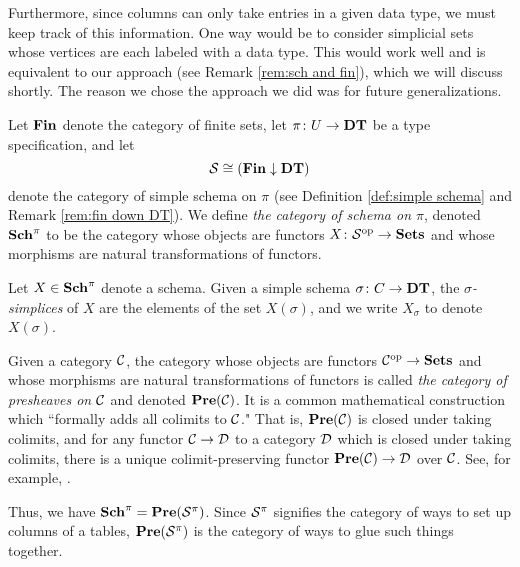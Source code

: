 \documentclass{amsart}
\begin{document}
Furthermore, since columns can only take entries in a given data type, we must keep track of this information.  One way would be to consider simplicial sets whose vertices are each labeled with a data type.  This would work well and is equivalent to our approach (see Remark \ref{rem:sch and fin}), which we will discuss shortly.  The reason we chose the approach we did was for future generalizations.

\begin{definition}\label{def:schema}

Let ${\bf Fin}$ denote the category of finite sets, let $\pi\colon U\rightarrow{\bf DT}$ be a type specification, and let $$\mathcal{S}\cong({\bf Fin}\downarrow{\bf DT})$$ denote the category of simple schema on $\pi$ (see Definition \ref{def:simple schema} and Remark \ref{rem:fin down DT}).  We define {\em the category of schema on $\pi$}, denoted ${\bf Sch}^\pi$ to be the category whose objects are functors $X\colon\mathcal{S}^\textnormal{op}\rightarrow{\bf Sets}$ and whose morphisms are natural transformations of functors.

Let $X\in{\bf Sch}^\pi$ denote a schema.  Given a simple schema $\sigma\colon C\rightarrow{\bf DT}$, the {\em $\sigma$-simplices} of $X$ are the elements of the set $X(\sigma)$, and we write $X_\sigma$ to denote $X(\sigma)$.

\end{definition}

\begin{remark}\label{rem:sch and fin}

Given a category $\mathcal{C}$, the category whose objects are functors $\mathcal{C}^\textnormal{op}\rightarrow{\bf Sets}$ and whose morphisms are natural transformations of functors is called {\em the category of presheaves on $\mathcal{C}$} and denoted ${\bf Pre}(\mathcal{C})$.  It is a common mathematical construction which ``formally adds all colimits to $\mathcal{C}$."  That is, ${\bf Pre}(\mathcal{C})$ is closed under taking colimits, and for any functor $\mathcal{C}\rightarrow\mathcal{D}$ to a category $\mathcal{D}$ which is closed under taking colimits, there is a unique colimit-preserving functor ${\bf Pre}(\mathcal{C})\rightarrow\mathcal{D}$ over $\mathcal{C}$.  See, for example, \cite[I.5.4]{MM}.

Thus, we have ${\bf Sch}^\pi={\bf Pre}(\mathcal{S}^\pi)$.  Since $\mathcal{S}^\pi$ signifies the category of ways to set up columns of a tables, ${\bf Pre}(\mathcal{S}^\pi)$ is the category of ways to glue such things together.

\end{remark}
\end{document}
